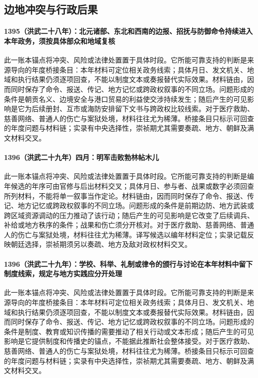 \subsection{边地冲突与行政后果}

\paragraph{1395（洪武二十八年）：北元诸部、东北和西南的边报、招抚与防御命令持续进入本年政务，须按具体部众和地域复核} 此一账本锚点将冲突、风险或法律处置置于具体时段。它所能可靠支持的判断是来源导向的年度桥接条目：本年材料可定位相关政务线索；具体月日、发文机关、地域和执行结果仍须逐项回查，不能以制度文本或奏报替代实际效果。材料链由，因而同时保存了命令、报送、传记、地方记忆或跨政权叙事的不同立场。问题形成的条件是朝贡名义、边境安全与港口贸易的利益使交涉持续发生；随后产生的可见影响是它为后续册封、互市或海防安排留下文书与跨政权比较线索。对于医疗救助、慈善网络、普通人的伤亡与案狱处境，材料往往尤为稀薄。桥接条目只标示可回查的年度问题与材料链；实录有中央选择性，崇祯期尤其需要奏疏、地方、朝鲜及满文材料交叉。

\paragraph{1396（洪武二十九年）四月：明军击败勃林帖木儿} 此一账本锚点将冲突、风险或法律处置置于具体时段。它所能可靠支持的判断是编年候选的年序可由官修与后出材料交叉；具体月日、参与者、战果或数字必须回查所列材料，不能将单一叙事当作定论。材料链由，因而同时保存了命令、报送、传记、地方记忆或跨政权叙事的不同立场。问题形成的条件是前期边防、地方武装或跨区域资源调动的压力推动了该行动；随后产生的可见影响是它改变了后续调兵、补给或地方秩序的条件；战果和伤亡须分开核对。对于医疗救助、慈善网络、普通人的伤亡与案狱处境，材料往往尤为稀薄。译写候选以编年材料定位；实录记载反映朝廷选择，崇祯期须另以奏疏、地方及敌对政权材料交叉。

\paragraph{1396（洪武二十九年）：学校、科举、礼制或律令的颁行与讨论在本年材料中留下制度线索，规定与地方实践应分开处理} 此一账本锚点将冲突、风险或法律处置置于具体时段。它所能可靠支持的判断是来源导向的年度桥接条目：本年材料可定位相关政务线索；具体月日、发文机关、地域和执行结果仍须逐项回查，不能以制度文本或奏报替代实际效果。材料链由，因而同时保存了命令、报送、传记、地方记忆或跨政权叙事的不同立场。问题形成的条件是制度、教育或知识传播的需要推动了相关行动或文本形成；随后产生的可见影响是它提供制度和传播史的锚点，不能据此推断社会整体接受。对于医疗救助、慈善网络、普通人的伤亡与案狱处境，材料往往尤为稀薄。桥接条目只标示可回查的年度问题与材料链；实录有中央选择性，崇祯期尤其需要奏疏、地方、朝鲜及满文材料交叉。

